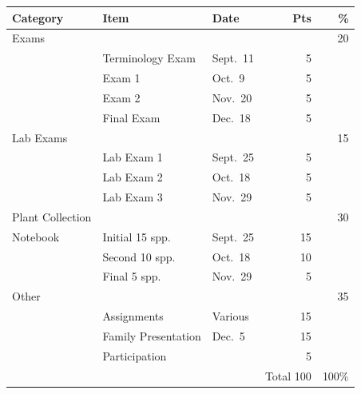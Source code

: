 \documentclass{tufte-handout}
\begin{document}
\begin{table}
\begin{tabular}{l l l r r}
Category & Item & Date &  Pts & \% \\
\hline
Exams & & & & 20 \\
& Terminology Exam & Sept.~11 & 5\\
& Exam 1 & Oct.~9  & 5 \\
& Exam 2 & Nov.~20  & 5 \\
& Final Exam & Dec.~18 & 5 \\ 
\hline
Lab Exams & & & & 15\\
& Lab Exam 1 & Sept.~25  & 5 \\
& Lab Exam 2 & Oct.~18 & 5 \\
& Lab Exam 3 & Nov.~29  & 5 \\ 	
\hline
Plant Collection & & & & 30 \\
Notebook & Initial 15 spp. & Sept.~25 & 15 \\
& Second 10 spp. & Oct.~18 & 10 \\
& Final 5 spp. & Nov.~29 & 5 \\
\hline 
Other & & & & 35 \\
& Assignments & Various & 15 \\
& Family Presentation & Dec.~5 & 15 \\
 & Participation &  & 5 \\
\hline
& & & Total 100 & 100\%
\end{tabular}
\end{table}
\end{document}
